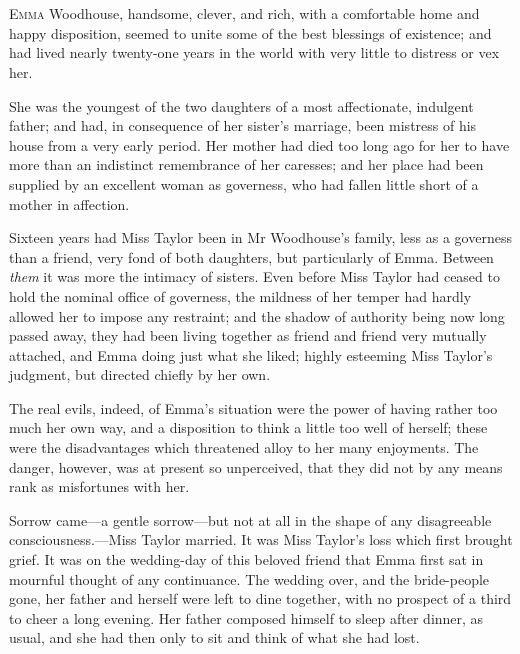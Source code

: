 \chapter[Chapter \thechapter]{}
	
\lettrine[lraise=0.3]{E}{mma} Woodhouse, handsome, clever, and rich, with a comfortable home and happy disposition, seemed to unite some of the best blessings of existence; and had lived nearly twenty-one years in the world with very little to distress or vex her.

She was the youngest of the two daughters of a most affectionate, indulgent father; and had, in consequence of her sister's marriage, been mistress of his house from a very early period. Her mother had died too long ago for her to have more than an indistinct remembrance of her caresses; and her place had been supplied by an excellent woman as governess, who had fallen little short of a mother in affection.

Sixteen years had Miss Taylor been in Mr Woodhouse's family, less as a governess than a friend, very fond of both daughters, but particularly of Emma. Between \textit{them} it was more the intimacy of sisters. Even before Miss Taylor had ceased to hold the nominal office of governess, the mildness of her temper had hardly allowed her to impose any restraint; and the shadow of authority being now long passed away, they had been living together as friend and friend very mutually attached, and Emma doing just what she liked; highly esteeming Miss Taylor's judgment, but directed chiefly by her own.

The real evils, indeed, of Emma's situation were the power of having rather too much her own way, and a disposition to think a little too well of herself; these were the disadvantages which threatened alloy to her many enjoyments. The danger, however, was at present so unperceived, that they did not by any means rank as misfortunes with her.

Sorrow came—a gentle sorrow—but not at all in the shape of any disagreeable consciousness.—Miss Taylor married. It was Miss Taylor's loss which first brought grief. It was on the wedding-day of this beloved friend that Emma first sat in mournful thought of any continuance. The wedding over, and the bride-people gone, her father and herself were left to dine together, with no prospect of a third to cheer a long evening. Her father composed himself to sleep after dinner, as usual, and she had then only to sit and think of what she had lost.

